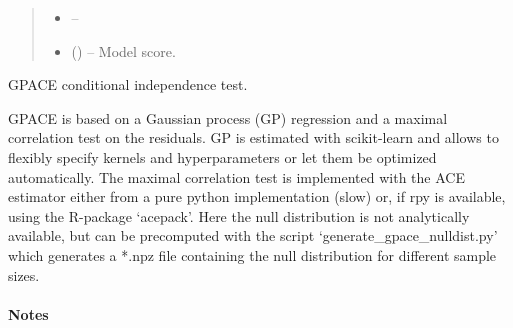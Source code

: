 \documentclass[letterpaper,10pt,english]{sphinxmanual}
\begin{document}
\begin{fulllineitems}
\begin{fulllineitems}
\begin{quote}
\begin{description}
\begin{itemize}
\item {} 
 -- 

\item {} 
 () -- Model score.

\end{itemize}

\end{description}\end{quote}

\end{fulllineitems}


\end{fulllineitems}


\begin{fulllineitems}
\label{\detokenize{index:tigramite.independence_tests.GPACE}}
GPACE conditional independence test.

GPACE is based on a Gaussian process (GP) regression and a maximal
correlation test on the residuals. GP is estimated with scikit-learn and
allows to flexibly specify kernels and hyperparameters or let them be
optimized automatically. The maximal correlation test is implemented with
the ACE estimator either from a pure python implementation (slow) or, if rpy
is available, using the R-package `acepack'. Here the null distribution is
not analytically available, but can be precomputed with the script
`generate\_gpace\_nulldist.py' which generates a *.npz file containing the
null distribution for different sample sizes.
\paragraph{Notes}


\end{fulllineitems}
\end{document}
